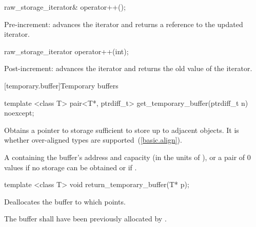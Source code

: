 \begin{itemdecl}
raw_storage_iterator& operator++();
\end{itemdecl}

\begin{itemdescr}
\pnum
\effects
Pre-increment:  advances the iterator and returns a reference to the updated iterator.
\end{itemdescr}

\begin{itemdecl}
raw_storage_iterator operator++(int);
\end{itemdecl}

\begin{itemdescr}
\pnum
\effects
Post-increment:  advances the iterator and returns the old value of the iterator.
\end{itemdescr}

[temporary.buffer]{Temporary buffers}

%
\begin{itemdecl}
template <class T>
  pair<T*, ptrdiff_t> get_temporary_buffer(ptrdiff_t n) noexcept;
\end{itemdecl}

\begin{itemdescr}
\pnum
\effects
Obtains a pointer to storage sufficient to store up to 
adjacent  objects.
It is  whether over-aligned types are
supported~(\ref{basic.align}).

\pnum
\returns
A  containing the buffer's address and capacity (in the units of
), or a pair of 0 values if no storage can be obtained or
if .
\end{itemdescr}

%
\begin{itemdecl}
template <class T> void return_temporary_buffer(T* p);
\end{itemdecl}

\begin{itemdescr}
\pnum
\effects
Deallocates the buffer to which 
points.

\pnum
\requires
The buffer shall have been previously allocated by .
\end{itemdescr}

